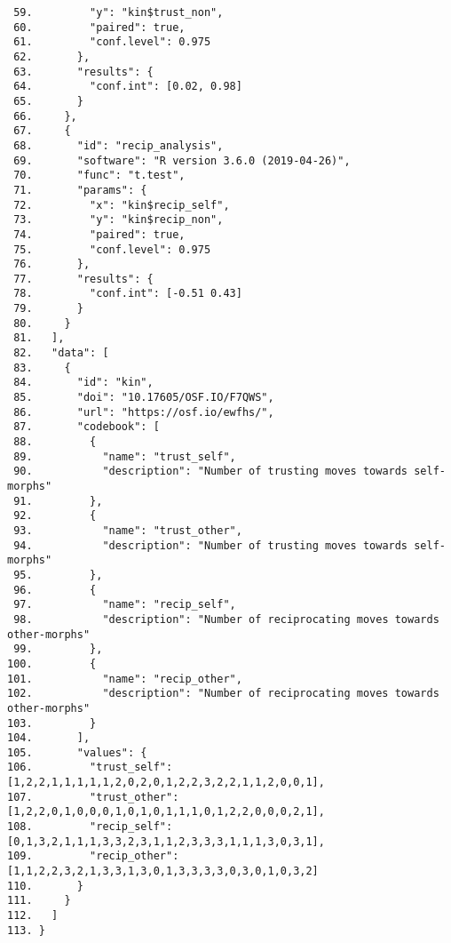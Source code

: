 \documentclass[english,doc,floatsintext]{apa6}
\begin{document}
\begin{verbatim}
 59.         "y": "kin$trust_non",
 60.         "paired": true,
 61.         "conf.level": 0.975
 62.       },
 63.       "results": {
 64.         "conf.int": [0.02, 0.98]
 65.       }
 66.     },
 67.     {
 68.       "id": "recip_analysis",
 69.       "software": "R version 3.6.0 (2019-04-26)",
 70.       "func": "t.test",
 71.       "params": {
 72.         "x": "kin$recip_self",
 73.         "y": "kin$recip_non",
 74.         "paired": true,
 75.         "conf.level": 0.975
 76.       },
 77.       "results": {
 78.         "conf.int": [-0.51 0.43]
 79.       }
 80.     }
 81.   ],
 82.   "data": [
 83.     {
 84.       "id": "kin",
 85.       "doi": "10.17605/OSF.IO/F7QWS",
 86.       "url": "https://osf.io/ewfhs/",
 87.       "codebook": [
 88.         {
 89.           "name": "trust_self",
 90.           "description": "Number of trusting moves towards self-morphs"
 91.         },
 92.         {
 93.           "name": "trust_other",
 94.           "description": "Number of trusting moves towards self-morphs"
 95.         },
 96.         {
 97.           "name": "recip_self",
 98.           "description": "Number of reciprocating moves towards other-morphs"
 99.         },
100.         {
101.           "name": "recip_other",
102.           "description": "Number of reciprocating moves towards other-morphs"
103.         }
104.       ],
105.       "values": {
106.         "trust_self": [1,2,2,1,1,1,1,1,2,0,2,0,1,2,2,3,2,2,1,1,2,0,0,1],
107.         "trust_other": [1,2,2,0,1,0,0,0,1,0,1,0,1,1,1,0,1,2,2,0,0,0,2,1],
108.         "recip_self": [0,1,3,2,1,1,1,3,3,2,3,1,1,2,3,3,3,1,1,1,3,0,3,1],
109.         "recip_other": [1,1,2,2,3,2,1,3,3,1,3,0,1,3,3,3,3,0,3,0,1,0,3,2]
110.       }
111.     }
112.   ]
113. }
\end{verbatim}
\end{document}
